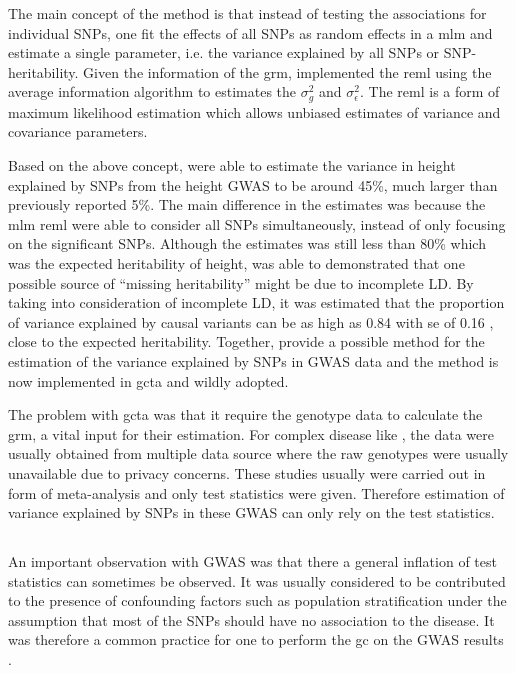 	The main concept of the method is that instead of testing the associations for individual \glspl{SNP}, one fit the effects of all SNPs as random effects in a \gls{mlm} and estimate a single parameter, i.e. the variance explained by all \glspl{SNP} or \gls{SNP}-heritability.
	Given the information of the \gls{grm}, \citep{Yang2011} implemented the \gls{reml} using the average information algorithm to estimates the $\sigma_g^2$ and $\sigma_\epsilon^2$.
	The \gls{reml} is a form of maximum likelihood estimation which allows unbiased estimates of variance and covariance parameters.
	
	Based on the above concept, \citet{Yang2010a} were able to estimate the variance in height explained by \glspl{SNP} from the height \gls{GWAS} to be around 45\%, much larger than previously reported 5\%.
	The main difference in the estimates was because the \gls{mlm} \gls{reml} were able to consider all \glspl{SNP} simultaneously, instead of only focusing on the significant \glspl{SNP}.
	Although the estimates was still less than 80\% which was the expected heritability of height, \citet{Yang2010a} was able to demonstrated that one possible source of ``missing heritability'' might be due to incomplete \gls{LD}.
	By taking into consideration of incomplete \gls{LD}, it was estimated that the proportion of variance explained by causal variants can be as high as 0.84 with \gls{se} of 0.16 \citep{Yang2010a}, close to the expected heritability.
	Together, \citet{Yang2011} provide a possible method for the estimation of the variance explained by \glspl{SNP} in \gls{GWAS} data and the method is now implemented in \gls{gcta} and wildly adopted.
	
	The problem with \gls{gcta} was that it require the genotype data to calculate the \gls{grm}, a vital input for their estimation.
	For complex disease like , the data were usually obtained from multiple data source where the raw genotypes were usually unavailable due to privacy concerns.
	These studies usually were carried out in form of meta-analysis and only test statistics were given.
	Therefore estimation of variance explained by \glspl{SNP} in these \gls{GWAS} can only rely on the test statistics. 
	  
	\subsection{}
	An important observation with \gls{GWAS} was that there a general inflation of test statistics can sometimes be observed. 
	It was usually considered to be contributed to the presence of confounding factors such as population stratification under the assumption that most of the \glspl{SNP} should have no association to the disease.
	It was therefore a common practice for one to perform the \gls{gc} on the \gls{GWAS} results \citep{Zheng2006}.
	
